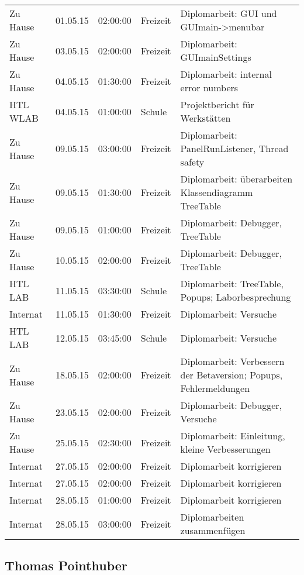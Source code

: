 \begin{small}
\begin{longtable}{ p{} p{} p{} p{} p{}}
Zu Hause	& 01.05.15	& 02:00:00	& Freizeit	& Diplomarbeit: GUI und GUImain->menubar \\
Zu Hause	& 03.05.15	& 02:00:00	& Freizeit	& Diplomarbeit: GUImainSettings \\
Zu Hause	& 04.05.15	& 01:30:00	& Freizeit	& Diplomarbeit: internal error numbers \\
HTL WLAB	& 04.05.15	& 01:00:00	& Schule	& Projektbericht f\"ur Werkst\"atten \\
Zu Hause	& 09.05.15	& 03:00:00	& Freizeit	& Diplomarbeit: PanelRunListener, Thread safety \\
Zu Hause	& 09.05.15	& 01:30:00	& Freizeit	& Diplomarbeit: \"uberarbeiten Klassendiagramm TreeTable \\
Zu Hause	& 09.05.15	& 01:00:00	& Freizeit	& Diplomarbeit: Debugger, TreeTable \\
Zu Hause	& 10.05.15	& 02:00:00	& Freizeit	& Diplomarbeit: Debugger, TreeTable \\
HTL LAB	& 11.05.15	& 03:30:00	& Schule	& Diplomarbeit: TreeTable, Popups; Laborbesprechung \\
Internat	& 11.05.15	& 01:30:00	& Freizeit	& Diplomarbeit: Versuche \\
HTL LAB	& 12.05.15	& 03:45:00	& Schule	& Diplomarbeit: Versuche \\
Zu Hause	& 18.05.15	& 02:00:00	& Freizeit	& Diplomarbeit: Verbessern der Betaversion; Popups, Fehlermeldungen \\
Zu Hause	& 23.05.15	& 02:00:00	& Freizeit	& Diplomarbeit: Debugger, Versuche \\
Zu Hause	& 25.05.15	& 02:30:00	& Freizeit	& Diplomarbeit: Einleitung, kleine Verbesserungen \\
Internat	& 27.05.15	& 02:00:00	& Freizeit	& Diplomarbeit korrigieren \\
Internat	& 27.05.15	& 02:00:00	& Freizeit	& Diplomarbeit korrigieren \\
Internat	& 28.05.15	& 01:00:00	& Freizeit	& Diplomarbeit korrigieren \\
Internat	& 28.05.15	& 03:00:00	& Freizeit	& Diplomarbeiten zusammenf\"ugen \\
 \end{longtable}
\end{small}

\subsection{Thomas Pointhuber}

